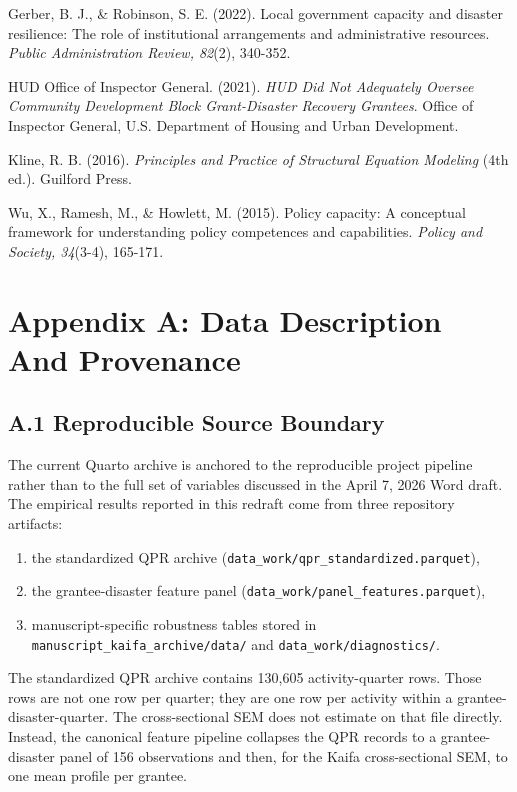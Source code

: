 \documentclass[
  letterpaper,
]{article}
\providecommand{\tightlist}{%
  \setlength{\itemsep}{0pt}\setlength{\parskip}{0pt}}
\begin{document}
Gerber, B. J., \& Robinson, S. E. (2022). Local government capacity and
disaster resilience: The role of institutional arrangements and
administrative resources. \emph{Public Administration Review, 82}(2),
340-352.

HUD Office of Inspector General. (2021). \emph{HUD Did Not Adequately
Oversee Community Development Block Grant-Disaster Recovery Grantees}.
Office of Inspector General, U.S. Department of Housing and Urban
Development.

Kline, R. B. (2016). \emph{Principles and Practice of Structural
Equation Modeling} (4th ed.). Guilford Press.

Wu, X., Ramesh, M., \& Howlett, M. (2015). Policy capacity: A conceptual
framework for understanding policy competences and capabilities.
\emph{Policy and Society, 34}(3-4), 165-171.

\newpage

\section*{Appendix A: Data Description And
Provenance}\label{appendix-a-data-description-and-provenance}

\subsection{A.1 Reproducible Source
Boundary}\label{a.1-reproducible-source-boundary}

The current Quarto archive is anchored to the reproducible project
pipeline rather than to the full set of variables discussed in the April
7, 2026 Word draft. The empirical results reported in this redraft come
from three repository artifacts:

\begin{enumerate}
\def\labelenumi{\arabic{enumi}.}
\tightlist
\item
  the standardized QPR archive
  (\texttt{data\_work/qpr\_standardized.parquet}),
\item
  the grantee-disaster feature panel
  (\texttt{data\_work/panel\_features.parquet}),
\item
  manuscript-specific robustness tables stored in
  \texttt{manuscript\_kaifa\_archive/data/} and
  \texttt{data\_work/diagnostics/}.
\end{enumerate}

The standardized QPR archive contains 130,605 activity-quarter rows.
Those rows are not one row per quarter; they are one row per activity
within a grantee-disaster-quarter. The cross-sectional SEM does not
estimate on that file directly. Instead, the canonical feature pipeline
collapses the QPR records to a grantee-disaster panel of 156
observations and then, for the Kaifa cross-sectional SEM, to one mean
profile per grantee.
\end{document}
